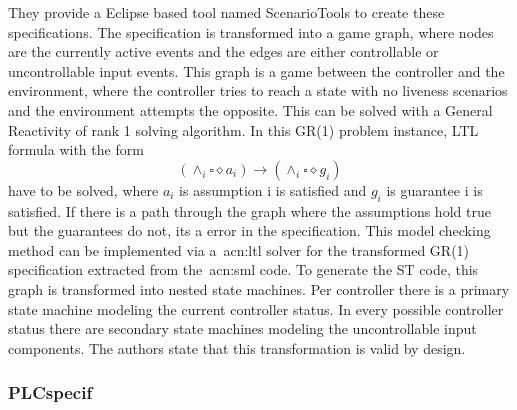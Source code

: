 They provide a Eclipse based tool named ScenarioTools to create these specifications.
The specification is transformed into a game graph, where nodes are the currently active events and the edges are either controllable or uncontrollable input events.
This graph is a game between the controller and the environment, where the controller tries to reach a state with no liveness scenarios and the environment attempts the opposite.
This can be solved with a General Reactivity of rank 1 solving algorithm.
In this GR(1) problem instance, LTL formula with the form
\begin{equation}
\left(\land_{i}\square\diamond a_{i} \right) \rightarrow \left(\land_{i}\square\diamond g_{i} \right)
\end{equation}
have to be solved, where $a_{i}$ is assumption i is satisfied and $g_{i}$ is guarantee i is satisfied.
If there is a path through the graph where the assumptions hold true but the guarantees do not, its a error in the specification.
This model checking method can be implemented via a~\acrshort{acn:ltl} solver for the transformed GR(1) specification extracted from the~\acrshort{acn:sml} code.
To generate the ST code, this graph is transformed into nested state machines.
Per controller there is a primary state machine modeling the current controller status.
In every possible controller status there are secondary state machines modeling the uncontrollable input components.
The authors state that this transformation is valid by design.

\subsubsection{PLCspecif}
\label{sec:sub:plfspecif}

